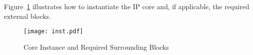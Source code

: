 %

Figure~\ref{fig:inst} illustrates how to instantiate the IP core and, if applicable, the
required external blocks.

\begin{figure}[!htbp]
    \centerline{\texttt{[image: inst.pdf]}}
    \vspace{0cm}\caption{Core Instance and Required Surrounding Blocks}
    \label{fig:inst}
\end{figure}



